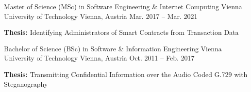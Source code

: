 


\begin{cventries}


\cventry
{Master of Science (MSc) in Software Engineering \& Internet Computing} %
{Vienna University of Technology} %
{Vienna, Austria} %
{Mar. 2017 -- Mar. 2021} %
{ %
\begin{cvitems}
\item {\textbf{Thesis: } Identifying Administrators of Smart Contracts from Transaction Data}
\end{cvitems}
}


\cventry
{Bachelor of Science (BSc) in Software \& Information Engineering} %
{Vienna University of Technology} %
{Vienna, Austria} %
{Oct. 2011 -- Feb. 2017} %
{ %
\begin{cvitems}
\item {\textbf{Thesis: } Transmitting Confidential Information over the Audio Coded G.729 with Steganography}
\end{cvitems}
}


\end{cventries}